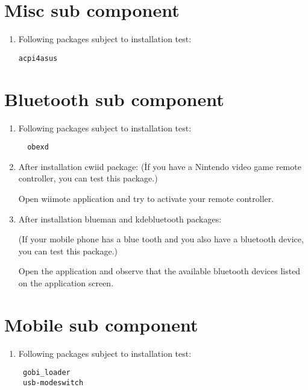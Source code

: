\documentclass[a4paper,10pt]{article}
\begin{document}
\section{Misc sub component}
\begin{enumerate}
 \item Following packages subject to installation test: 
\begin{verbatim}
acpi4asus 
\end{verbatim}

\end{enumerate}

\section{Bluetooth sub component}
\begin{enumerate}

 \item Following packages subject to installation test: 
\begin{verbatim}
  obexd
\end{verbatim}

 \item After installation cwiid package:
 (İf you have a Nintendo video game remote controller, you can test this package.)

Open wiimote application and try to activate your remote controller.
 \item After installation blueman and kdebluetooth packages:

(If your mobile phone has a blue tooth and you also have a bluetooth device, you can test this package.) 

Open the application and observe that the available bluetooth devices listed on the application screen.

\end{enumerate}

\section{Mobile sub component}
\begin{enumerate}
 \item Following packages subject to installation test: 
\begin{verbatim}
 gobi_loader
 usb-modeswitch
\end{verbatim}

\end{enumerate}
\end{document}
